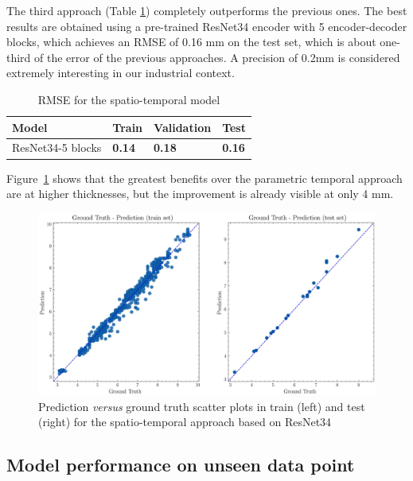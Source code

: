 The third approach (Table \ref{tab:spatial_temporal_model_results}) completely outperforms the previous ones. The best results are obtained using a pre-trained ResNet34 encoder with 5 encoder-decoder blocks, which achieves an RMSE of 0.16 mm on the test set, which is about one-third of the error of the previous approaches. A precision of 0.2mm is considered extremely interesting in our industrial context. 
\begin{table}
    \centering
    \caption{RMSE for the spatio-temporal model}
    \begin{tabular}{llll}
    \toprule
    \textbf{Model} & \textbf{Train}  & \textbf{Validation}  & \textbf{Test}  \\
    \midrule
    ResNet34-5 blocks & \textbf{0.14} & \textbf{0.18} & \textbf{0.16} \\
    \bottomrule
    \end{tabular}
    \label{tab:spatial_temporal_model_results}
\end{table}
Figure~\ref{fig:gt_prediction_spatial_temporal} shows that the greatest benefits over the parametric temporal approach are at higher thicknesses, but the improvement is already visible at only 4 mm.

\begin{figure}
\centering
\includegraphics[scale=0.48]{images/chapter_4/gt_spatial_temporal.eps}
\caption{Prediction \textit{versus} ground truth scatter plots in train (left) and test (right) for the spatio-temporal approach based on ResNet34}
\label{fig:gt_prediction_spatial_temporal}
\end{figure}

\subsection{Model performance on unseen data point}

